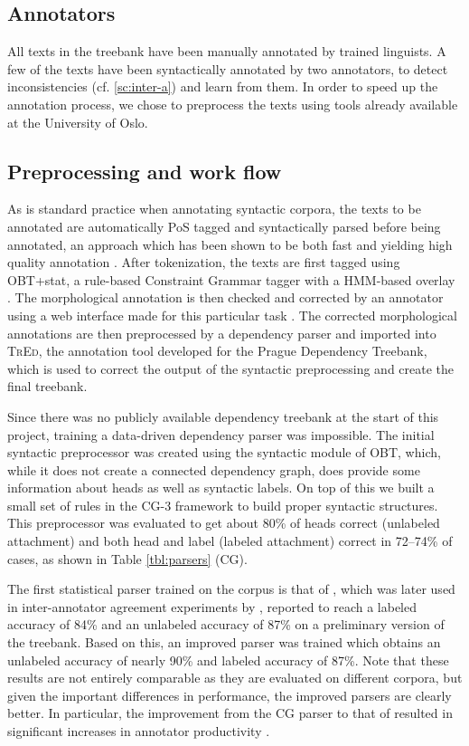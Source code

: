 \documentclass[10pt,a4paper]{article}
\let\app=\textsc
\begin{document}
\subsection{Annotators}
All texts in the treebank have been manually annotated by trained linguists. A
few of the texts have been syntactically annotated by two annotators, to
detect inconsistencies (cf. \ref{sc:inter-a}) and learn from them. In order to speed up the annotation
process, we chose to preprocess the texts using tools already available at the
University of Oslo.

\subsection{Preprocessing and work flow}
As is standard practice when annotating syntactic corpora, the texts to be
annotated are automatically PoS tagged and syntactically parsed before being
annotated, an approach which has been shown to be both fast and yielding
high quality annotation \cite{Mar:San:Mar:93,For:Sag:10,Skjaerholt:13}.
After tokenization, the texts are first tagged using OBT+stat,
a rule-based Constraint Grammar tagger with a HMM-based overlay \cite{Johannessen:etal:12}.
 The morphological annotation is then checked and corrected by an annotator using a web interface made for this
particular task \cite{Lyn:13}. The corrected morphological annotations are
then preprocessed by a dependency parser and imported into \app{TrEd}, the
annotation tool developed for the Prague Dependency Treebank, which is used to
correct the output of the syntactic preprocessing and create the final
treebank.

Since there was no publicly available dependency treebank at the start
of this project, training a data-driven dependency parser was
impossible. The initial syntactic preprocessor was
created using the syntactic module of OBT, which, while it does not
create a connected dependency graph, does provide some information
about heads as well as syntactic labels. On top of this we built a
small set of rules in the CG-3 framework \cite{Did:2013} to build
proper syntactic structures. This preprocessor was evaluated to get
about 80\% of heads correct (unlabeled attachment) and both head and
label (labeled attachment) correct in 72--74\% of cases, as shown in
Table \ref{tbl:parsers} (CG).

The first statistical parser trained on the corpus is that of
, which was later used in inter-annotator
agreement experiments by , reported to reach a
labeled accuracy of 84\% and an unlabeled accuracy of 87\% on a
preliminary version of the treebank. Based on this, an improved parser
was trained which obtains an unlabeled accuracy of nearly 90\% and
labeled accuracy of 87\%.
Note that these results are not entirely comparable as they
are evaluated on different corpora, but given the important differences in
performance, the improved parsers are clearly better. In particular, the
improvement from the CG parser to that of  resulted in
significant increases in annotator productivity \cite{Skjaerholt:13}.
\end{document}
